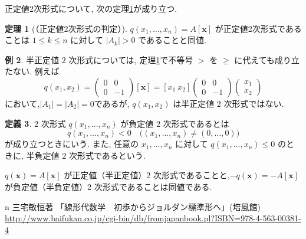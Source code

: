 \documentclass[dvipdfmx,a4paper,11pt]{article} %
\theoremstyle{definition}
\newtheorem{thm}{定理}[section]
\newtheorem{defn}[thm]{定義}
\newtheorem{eg}[thm]{例}
\begin{document}
正定値2次形式について, 次の定理\ref{thm-M-6.4.3}が成り立つ.

\begin{thm}
[（正定値2次形式の判定）{\cite[定理6.4.3]{M}}]
\label{thm-M-6.4.3}
\(
q(x_1,\ldots,x_n)=A[\bm{x}]
\)
が正定値2次形式であることは
\(
1\leq k\leq n\text{ に対して }\lvert A_k\rvert>0
\)
であることと同値. 
\end{thm}

\begin{eg}
半正定値 \(2\) 次形式については, 定理\ref{thm-M-6.4.3}で不等号 \(>\) を \(\geq\) に代えても成り立たない. 例えば
\[
q(x_1,x_2)
=
\begin{pmatrix}
0&0\\
0&-1
\end{pmatrix}[\bm{x}]
=
[x_1\ x_2]
\begin{pmatrix}
0&0\\
0&-1
\end{pmatrix}
\begin{pmatrix}
x_1\\
x_2
\end{pmatrix}
\]
において,\(|A_1|=|A_2|=0\)であるが, \(q(x_1,x_2)\) は半正定値 \(2\) 次形式ではない.
\end{eg}

\begin{defn}
\(2\) 次形式 \(q(x_1,\ldots,x_n)\) が負定値 \(2\) 次形式であるとは
\[
q(x_1,\ldots,x_n)<0
\quad
\bigl((x_1,\ldots,x_n)\neq(0,\ldots,0)\bigr)
\]
が成り立つときにいう. また, 任意の \(x_1,\ldots,x_n\) に対して
\(
q(x_1,\ldots,x_n)\leq0
\)
のときに, 半負定値 \(2\) 次形式であるという.
\end{defn}

\(q(\bm{x})=A[\bm{x}]\) が正定値（半正定値）\(2\) 次形式であることと,\(-q(\bm{x})=-A[\bm{x}]\)が負定値（半負定値）\(2\) 次形式であることは同値である.



\begin{thebibliography}{n}
三宅敏恒著 「線形代数学　初歩からジョルダン標準形へ」(培風館)
\url{http://www.baifukan.co.jp/cgi-bin/db/fromjapanbook.pl?ISBN=978-4-563-00381-4}
\end{thebibliography}
 
\end{document}
